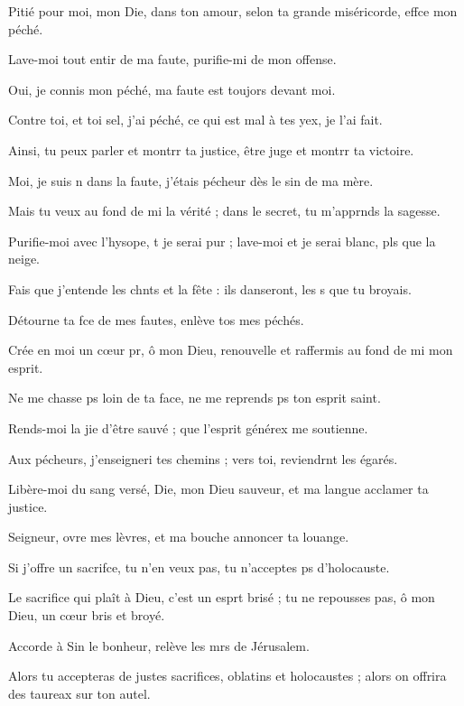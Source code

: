\item Pitié pour moi, mon Die, dans ton amour,\psstar{} selon ta grande miséricorde, effce mon péché.
\item Lave-moi tout entir de ma faute,\psstar{} purifie-mi de mon offense.
\item Oui, je connis mon péché,\psstar{} ma faute est toujors devant moi.
\item Contre toi, et toi sel, j’ai péché,\psstar{} ce qui est mal à tes yex, je l’ai fait.
\item Ainsi, tu peux parler et montrr ta justice,\psstar{} être juge et montrr ta victoire.
\item Moi, je suis n dans la faute,\psstar{} j’étais pécheur dès le sin de ma mère.
\item Mais tu veux au fond de mi la vérité ;\psstar{} dans le secret, tu m’apprnds la sagesse.
\item Purifie-moi avec l’hysope, t je serai pur ;\psstar{} lave-moi et je serai blanc, pls que la neige.
\item Fais que j’entende les chnts et la fête :\psstar{} ils danseront, les s que tu broyais.
\item Détourne ta fce de mes fautes,\psstar{} enlève tos mes péchés.
\item Crée en moi un cœur pr, ô mon Dieu,\psstar{} renouvelle et raffermis au fond de mi mon esprit.
\item Ne me chasse ps loin de ta face,\psstar{} ne me reprends ps ton esprit saint.
\item Rends-moi la jie d’être sauvé ;\psstar{} que l’esprit générex me soutienne.
\item Aux pécheurs, j’enseigneri tes chemins ;\psstar{} vers toi, reviendrnt les égarés.
\item Libère-moi du sang versé, Die, mon Dieu sauveur,\psstar{} et ma langue acclamer ta justice.
\item Seigneur, ovre mes lèvres,\psstar{} et ma bouche annoncer ta louange.
\item Si j’offre un sacrifce, tu n’en veux pas,\psstar{} tu n’acceptes ps d’holocauste.
\item Le sacrifice qui plaît à Dieu, c’est un esprt brisé ;\psstar{} tu ne repousses pas, ô mon Dieu, un cœur bris et broyé.
\item Accorde à Sin le bonheur,\psstar{} relève les mrs de Jérusalem.
\item Alors tu accepteras de justes sacrifices, oblatins et holocaustes ;\psstar{} alors on offrira des taureax sur ton autel.